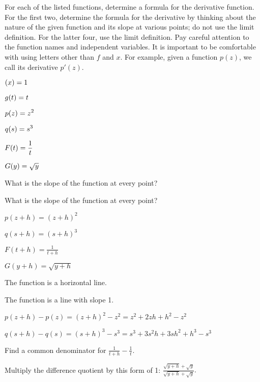 \begin{activity} \label{A:2.2.2}
For each of the listed functions, determine a formula for the derivative function.  For the first two, determine the formula for the derivative by thinking about the nature of the given function and its slope at various points; do not use the limit definition.  For the latter four, use the limit definition.  Pay careful attention to the function names and independent variables.  It is important to be comfortable with using letters other than $f$ and $x$.  For example, given a function $p(z)$, we call its derivative $p'(z)$.
\begin{multicols}{3}
\ba
	\item $\displaystyle (x) = 1$
	\item $\displaystyle g(t) = t$
	\item $\displaystyle p(z) = z^2$
	\item $\displaystyle q(s) = s^3$
	\item $\displaystyle F(t) = \frac{1}{t}$
	\item $\displaystyle G(y) = \sqrt{y}$
\ea
\end{multicols}

\end{activity}
\begin{smallhint}
\ba
	\item  What is the slope of the function at every point?
	\item  What is the slope of the function at every point?
	\item  $p(z+h) = (z+h)^2$
	\item  $q(s+h) = (s+h)^3$
	\item  $F(t+h) = \frac{1}{t+h}$
	\item  $G(y+h) = \sqrt{y+h}$
\ea
\end{smallhint}
\begin{bighint}
\ba
	\item  The function is a horizontal line.
	\item  The function is a line with slope 1.
	\item  $p(z+h) - p(z) = (z+h)^2 - z^2 = z^2 + 2zh + h^2 - z^2$
	\item  $q(s+h) - q(s) = (s+h)^3 - s^3 = s^3 + 3s^2h + 3sh^2 + h^3 - s^3$
	\item  Find a common denominator for $ \frac{1}{t+h} - \frac{1}{t}$.
	\item  Multiply the difference quotient by this form of 1: $\frac{\sqrt{y+h} + \sqrt{y}}{\sqrt{y+h} + \sqrt{y}}.$
\ea
\end{bighint}
